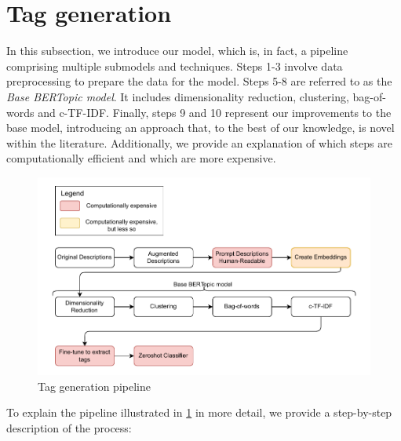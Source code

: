 \section{Tag generation}
\label{sec:tag_generation}
In this subsection, we introduce our model, which is, in fact, a pipeline comprising multiple submodels and techniques. Steps 1-3 involve data preprocessing to prepare the data for the model. Steps 5-8 are referred to as the \textit{Base BERTopic model}. It includes dimensionality reduction, clustering, bag-of-words and c-TF-IDF. Finally, steps 9 and 10 represent our improvements to the base model, introducing an approach that, to the best of our knowledge, is novel within the literature. Additionally, we provide an explanation of which steps are computationally efficient and which are more expensive.

\begin{figure}[h]
    \centering
    \includegraphics[width=\textwidth]{figures/tag_generation_pipeline.pdf}
    \caption{Tag generation pipeline}
    \label{fig:tag_generation_pipeline}
\end{figure}

To explain the pipeline illustrated in \cref{fig:tag_generation_pipeline} in more detail, we provide a step-by-step description of the process:

